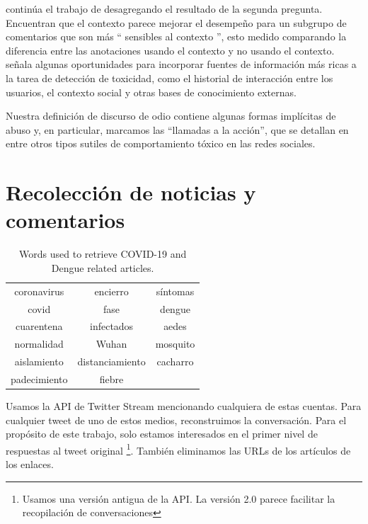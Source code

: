 \citet{xenos-2021-context} continúa el trabajo de \citet{pavlopoulos2020toxicity} desagregando el resultado de la segunda pregunta. Encuentran que el contexto parece mejorar el desempeño para un subgrupo de comentarios que son más `` sensibles al contexto '', esto medido comparando la diferencia entre las anotaciones usando el contexto y no usando el contexto. \citet{sheth2021defining} señala algunas oportunidades para incorporar fuentes de información más ricas a la tarea de detección de toxicidad, como el historial de interacción entre los usuarios, el contexto social y otras bases de conocimiento externas.

Nuestra definición de discurso de odio contiene algunas formas implícitas de abuso y, en particular, marcamos las ``llamadas a la acción'', que se detallan en \citet{wiegand2021implicitly} entre otros tipos sutiles de comportamiento tóxico en las redes sociales.

\section{Recolección de noticias y comentarios}

\begin{table}[t]
    \centering
    \begin{tabular}{ c|c|c }
        coronavirus  &  encierro          & síntomas \\
        covid        &  fase              & dengue   \\
        cuarentena   &  infectados        & aedes    \\
        normalidad   &  Wuhan             & mosquito \\
        aislamiento  &  distanciamiento   & cacharro \\
        padecimiento &  fiebre            &          \\
    \end{tabular}
    \caption{Words used to retrieve COVID-19 and Dengue related articles.\label{tab:article_words}}
\end{table}




Usamos la API de Twitter Stream mencionando cualquiera de estas cuentas.  Para cualquier tweet de uno de estos medios, reconstruimos la conversación. Para el propósito de este trabajo, solo estamos interesados en el primer nivel de respuestas al tweet original \footnote{Usamos una versión antigua de la API. La versión 2.0 parece facilitar la recopilación de conversaciones}. También eliminamos las URLs de los artículos de los enlaces.


